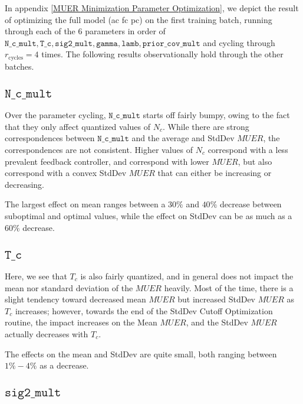 In appendix \ref{MUER Minimization Parameter Optimization}, we depict the result of optimizing the full model (ac fc pc) on the first training batch, running through each of the $6$ parameters in order of \\
\noindent $\mathtt{N\_c\_mult},\mathtt{T\_c},\mathtt{sig2\_mult},\mathtt{gamma},\mathtt{lamb},\mathtt{prior\_cov\_mult}$ and cycling through $r_{\text{cycles}} = 4$ times.  The following results observationally hold through the other batches.  



\subsection{$\mathtt{N\_c\_mult}$}

Over the parameter cycling, $\mathtt{N\_c\_mult}$ starts off fairly bumpy, owing to the fact that they only affect quantized values of $N_c$.  While there are strong correspondences between $\mathtt{N\_c\_mult}$ and the average and StdDev $MUER$, the correspondences are not consistent. Higher values of $N_c$ correspond with a less prevalent feedback controller, and correspond with lower $MUER$, but also correspond with a convex StdDev $MUER$ that can either be increasing or decreasing.

The largest effect on mean ranges between a $30\%$ and $40\%$ decrease between suboptimal and optimal values, while the effect on StdDev can be as much as a $60\%$ decrease.

\subsection{$\mathtt{T\_c}$}

Here, we see that $T_c$ is also fairly quantized, and in general does not impact the mean nor standard deviation of the $MUER$ heavily.  Most of the time, there is a slight tendency toward decreased mean $MUER$ but increased StdDev $MUER$ as $T_c$ increases; however, towards the end of the StdDev Cutoff Optimization routine, the impact increases on the Mean $MUER$, and the StdDev $MUER$ actually decreases with $T_c$.

The effects on the mean and StdDev are quite small, both ranging between $1\%-4\%$ as a decrease.

\subsection{$\mathtt{sig2\_mult}$}

